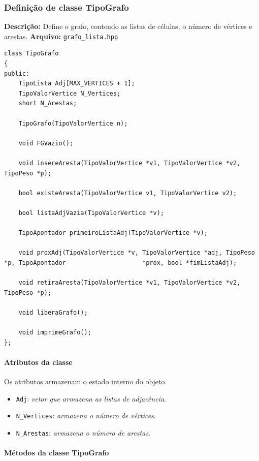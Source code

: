 \documentclass{article}
\begin{document}
\subsubsection*{Definição de classe TipoGrafo}
    \textbf{Descrição:} Define o grafo, contendo as listas de células, o número de vértices e arestas.
\textbf{Arquivo:} \texttt{grafo\_lista.hpp}
\begin{verbatim}
class TipoGrafo
{
public:
    TipoLista Adj[MAX_VERTICES + 1];
    TipoValorVertice N_Vertices;
    short N_Arestas;

    TipoGrafo(TipoValorVertice n);

    void FGVazio();

    void insereAresta(TipoValorVertice *v1, TipoValorVertice *v2, TipoPeso *p);

    bool existeAresta(TipoValorVertice v1, TipoValorVertice v2);

    bool listaAdjVazia(TipoValorVertice *v);

    TipoApontador primeiroListaAdj(TipoValorVertice *v);

    void proxAdj(TipoValorVertice *v, TipoValorVertice *adj, TipoPeso *p, TipoApontador                     *prox, bool *fimListaAdj);

    void retiraAresta(TipoValorVertice *v1, TipoValorVertice *v2, TipoPeso *p);

    void liberaGrafo();

    void imprimeGrafo();
};
\end{verbatim}

\paragraph*{Atributos da classe}

    Os atributos armazenam o estado interno do objeto.

\begin{itemize}
    \item \texttt{Adj}: \textit{vetor que armazena as listas de adjacência}.
    \item \texttt{N\_Vertices}: \textit{armazena o número de vértices}.
    \item \texttt{N\_Arestas}: \textit{armazena o número de arestas}.
\end{itemize}


\paragraph*{Métodos da classe TipoGrafo}
\end{document}
